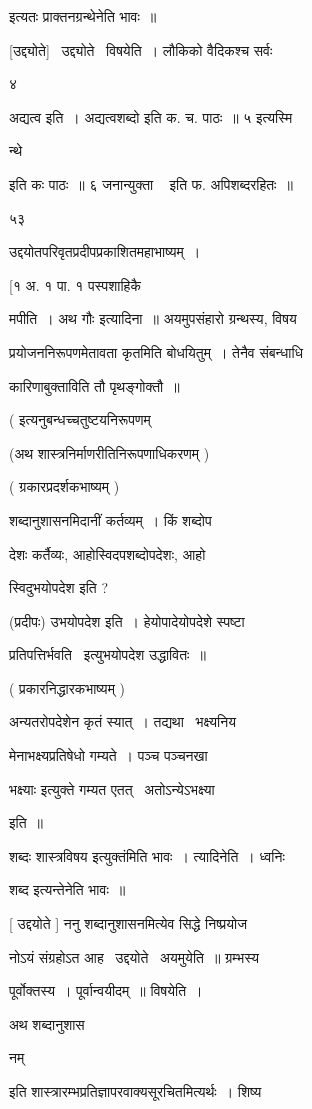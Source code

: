 \documentclass[11pt, openany]{book}
\begin{document}
इत्यतः प्राक्तनग्रन्थेनेति भावः~॥ 

[उद्द्योते] \textendash\ उद्द्योते \textendash\ विषयेति~। लौकिको वैदिकश्च सर्वः 

४ {\qt अद्यत्व इति~। अद्यत्वशब्दो इति क. च. पाठः~॥ ५ इत्यस्मि \textendash\ 

न्थे} इति कः पाठः~॥ ६ {\qt जनान्युक्ता \textendash\ } इति फ. अपिशब्दरहितः~॥ 

५३ 

उद्दयोतपरिवृतप्रदीपप्रकाशितमहाभाष्यम्~। 

[१ अ. १ पा. १ पस्पशाहिकै 

मपीति~। {\qt अथ गौः इत्यादिना~॥} अयमुपसंहारो ग्रन्थस्य, विषय \textendash\ 

प्रयोजननिरूपणमेतावता कृतमिति बोधयितुम्~। तेनैव संबन्धाधि \textendash\ 

कारिणाबुक्ताविति तौ पृथङ्गोक्तौ~॥ 

( इत्यनुबन्धच्चतुष्टयनिरूपणम् 

(अथ शास्त्रनिर्माणरीतिनिरूपणाधिकरणम् ) 

( ग्रकारप्रदर्शकभाष्यम् ) 

शब्दानुशासनमिदानीं कर्तव्यम्~। किं शब्दोप \textendash\ 

देशः कर्तैव्यः, आहोस्विदपशब्दोपदेशः, आहो \textendash\ 

स्विदुभयोपदेश इति ? 

(प्रदीपः) उभयोपदेश इति~। हेयोपादेयोपदेशे स्पष्टा 

प्रतिपत्तिर्भवति \textendash\ इत्युभयोपदेश उद्धावितः~॥ 

( प्रकारनिद्धारकभाष्यम् ) 

अन्यतरोपदेशेन कृतं स्यात्~। तद्यथा \textendash\ भक्ष्यनिय \textendash\ 

मेनाभक्ष्यप्रतिषेधो गम्यते~। {\qt पञ्च पञ्चनखा}

भक्ष्याः इत्युक्ते गम्यत एतत् \textendash\ अतोऽन्येऽभक्ष्या 

इति~॥ 

शब्दः शास्त्रविषय इत्युक्तंमिति भावः~। त्यादिनेति~। ध्वनिः 

शब्द इत्यन्तेनेति भावः~॥ 

[ उद्दयोते ] ननु शब्दानुशासनमित्येव सिद्धे निष्प्रयोज \textendash\ 

नोऽयं संग्रहोऽत आह \textendash\ उद्दयोते \textendash\ अयमुयेति~॥ ग्रम्भस्य \textendash\ 

पूर्वोक्तस्य~। पूर्वान्वयीदम्~॥ विषयेति~। {\qt अथ शब्दानुशास \textendash\ 

नम्} इति शास्त्रारम्भप्रतिज्ञापरवाक्यसूरचितमित्यर्थः~। शिष्य \textendash\ 
\end{document}
